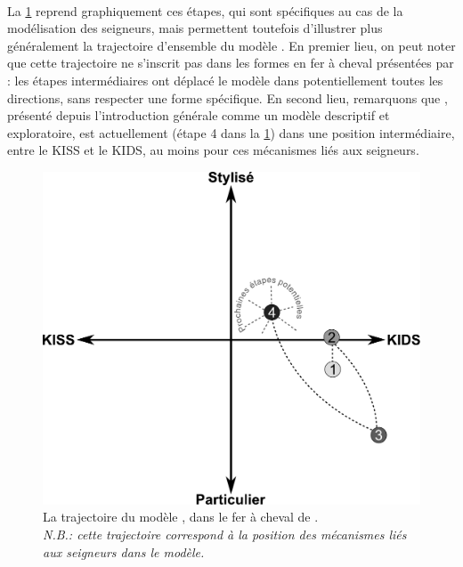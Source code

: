 \paragraph[ccltemps]{}
La \cref{fig:trajectoire-simfeodal} reprend graphiquement ces étapes, qui sont spécifiques au cas de la modélisation des seigneurs, mais permettent toutefois d'illustrer plus généralement la trajectoire d'ensemble du modèle \simfeodal{}.
En premier lieu, on peut noter que cette trajectoire ne s'inscrit pas dans les formes \og en fer à cheval\fg{} présentées par \textcite{banos2013modeliser} :
	les étapes intermédiaires ont \og déplacé\fg{} le modèle dans potentiellement toutes les directions, sans respecter une forme spécifique.
En second lieu, remarquons que \simfeodal{}, présenté depuis l'introduction générale comme un modèle descriptif et exploratoire, est actuellement (étape 4 dans la \cref{fig:trajectoire-simfeodal}) dans une position intermédiaire, entre le KISS et le KIDS, au moins pour ces mécanismes liés aux seigneurs. 


\begin{figure}[H]
	\centering
	\includegraphics[width=.8\linewidth]{img/trajectoire_simfeodal.pdf}
	\caption[La trajectoire du modèle \simfeodal{}, dans le \og fer à cheval\fg{} de \textcite{banos2013modeliser}.]{La trajectoire du modèle \simfeodal{}, dans le \og fer à cheval\fg{} de \textcite{banos2013modeliser}.\\
	\textit{N.B.: cette trajectoire correspond à la position des mécanismes liés aux seigneurs dans le modèle.}}
	\label{fig:trajectoire-simfeodal}
\end{figure}



